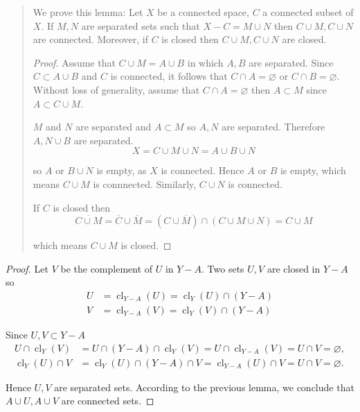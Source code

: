 \begin{quotation}
	We prove this lemma: Let \( X \) be a connected space, \( C \) a connected subset of \( X \). If \( M, N \) are separated sets such that \( X - C = M \cup N \) then \( C \cup M, C \cup N \) are connected. Moreover, if \( C \) is closed then \( C \cup M, C \cup N \) are closed.

	\begin{proof}
		Assume that \( C \cup M = A \cup B \) in which \( A, B \) are separated. Since \( C \subset A \cup B \) and \( C \) is connected, it follows that \( C \cap A = \varnothing \) or \( C \cap B = \varnothing \). Without loss of generality, assume that \( C \cap A = \varnothing \) then \( A \subset M \) since \( A \subset C \cup M \).

		\( M \) and \( N \) are separated and \( A \subset M \) so \( A, N \) are separated. Therefore \( A, N \cup B \) are separated.
		\[
			X = C \cup M \cup N = A \cup B \cup N
		\]

		so \( A \) or \( B \cup N \) is empty, as \( X \) is connected. Hence \( A \) or \( B \) is empty, which means \( C \cup M \) is connnected. Similarly, \( C \cup N \) is connected.

		If \( C \) is closed then
		\[
			\overline{C \cup M} = \overline{C} \cup \overline{M} = (C \cup \overline{M}) \cap (C \cup M \cup N) = C \cup M
		\]

		which means \( C \cup M \) is closed.
	\end{proof}
\end{quotation}

\begin{proof}
	Let \( V \) be the complement of \( U \) in \( Y - A \). Two sets \( U, V \) are closed in \( Y - A \) so
	\begingroup
	\allowdisplaybreaks%
	\begin{align*}
		U & = \operatorname{cl}_{Y - A}(U) = \operatorname{cl}_{Y}(U) \cap (Y - A) \\
		V & = \operatorname{cl}_{Y - A}(V) = \operatorname{cl}_{Y}(V) \cap (Y - A)
	\end{align*}
	\endgroup

	Since \( U, V \subset Y - A \)
	\begingroup
	\allowdisplaybreaks%
	\begin{align*}
		U \cap \operatorname{cl}_{Y}(V) & = U \cap (Y - A) \cap \operatorname{cl}_{Y}(V) = U \cap \operatorname{cl}_{Y - A}(V) = U \cap V = \varnothing, \\
		\operatorname{cl}_{Y}(U) \cap V & = \operatorname{cl}_{Y}(U) \cap (Y - A) \cap V = \operatorname{cl}_{Y - A}(U) \cap V = U \cap V = \varnothing.
	\end{align*}
	\endgroup

	Hence \( U, V \) are separated sets. According to the previous lemma, we conclude that \( A \cup U, A \cup V \) are connected sets.
\end{proof}

